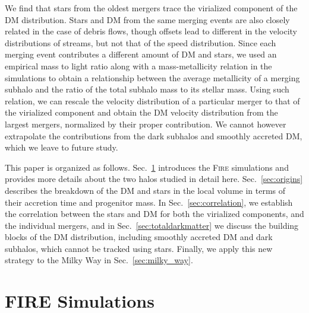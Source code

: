 \documentclass[twocolumn,preprintnumbers]{aastex6}
\DeclareRobustCommand{\Sec}[1]{Sec.~\ref{#1}}
\begin{document}
We find that stars from the oldest mergers trace the virialized component of the DM distribution. Stars and DM from the same merging events are also closely related in the case of debris flows, though offsets lead to different in the velocity distributions of streams, but not that of the speed distribution. 
Since each merging event contributes a different amount of DM and stars, we used an empirical mass to light ratio along with a mass-metallicity relation in the simulations to obtain a relationship between the average metallicity of a merging subhalo and the ratio of the total subhalo mass to its stellar mass. Using such relation, we can rescale the velocity distribution of a particular merger to that of the virialized component and obtain the DM velocity distribution from the largest mergers, normalized by their proper contribution. We cannot however extrapolate the contributions from the dark subhalos and smoothly accreted DM, which we leave to future study.


This paper is organized as follows. Sec.~\ref{sec:fire} introduces the \textsc{Fire} simulations and provides more details about the two halos studied in detail here.  Sec.~\ref{sec:origins} describes the breakdown of the DM and stars in the local volume in terms of their accretion time and progenitor mass. In \Sec{sec:correlation}, we establish the correlation between the stars and DM for both the virialized components, and the individual mergers, and in \Sec{sec:totaldarkmatter} we discuss the building blocks of the DM distribution, including smoothly accreted DM and dark subhalos, which cannot be tracked using stars. Finally, we apply this new strategy to the Milky Way in \Sec{sec:milky_way}.




\section{FIRE Simulations}
\label{sec:fire}
\end{document}
